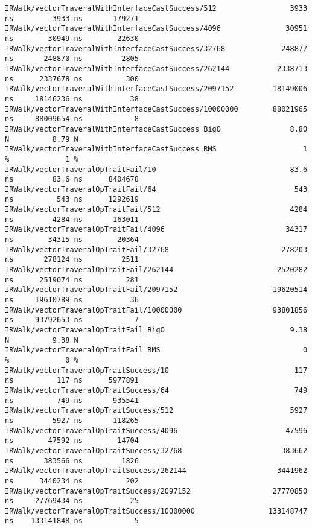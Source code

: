 \begin{code}
\begin{verbatim}
IRWalk/vectorTraveralWithInterfaceCastSuccess/512                 3933 ns         3933 ns       179271
IRWalk/vectorTraveralWithInterfaceCastSuccess/4096               30951 ns        30949 ns        22630
IRWalk/vectorTraveralWithInterfaceCastSuccess/32768             248877 ns       248870 ns         2805
IRWalk/vectorTraveralWithInterfaceCastSuccess/262144           2338713 ns      2337678 ns          300
IRWalk/vectorTraveralWithInterfaceCastSuccess/2097152         18149006 ns     18146236 ns           38
IRWalk/vectorTraveralWithInterfaceCastSuccess/10000000        88021965 ns     88009654 ns            8
IRWalk/vectorTraveralWithInterfaceCastSuccess_BigO                8.80 N          8.79 N
IRWalk/vectorTraveralWithInterfaceCastSuccess_RMS                    1 %             1 %
IRWalk/vectorTraveralOpTraitFail/10                               83.6 ns         83.6 ns      8404678
IRWalk/vectorTraveralOpTraitFail/64                                543 ns          543 ns      1292619
IRWalk/vectorTraveralOpTraitFail/512                              4284 ns         4284 ns       163011
IRWalk/vectorTraveralOpTraitFail/4096                            34317 ns        34315 ns        20364
IRWalk/vectorTraveralOpTraitFail/32768                          278203 ns       278124 ns         2511
IRWalk/vectorTraveralOpTraitFail/262144                        2520282 ns      2519074 ns          281
IRWalk/vectorTraveralOpTraitFail/2097152                      19620514 ns     19610789 ns           36
IRWalk/vectorTraveralOpTraitFail/10000000                     93801856 ns     93792653 ns            7
IRWalk/vectorTraveralOpTraitFail_BigO                             9.38 N          9.38 N
IRWalk/vectorTraveralOpTraitFail_RMS                                 0 %             0 %
IRWalk/vectorTraveralOpTraitSuccess/10                             117 ns          117 ns      5977891
IRWalk/vectorTraveralOpTraitSuccess/64                             749 ns          749 ns       935541
IRWalk/vectorTraveralOpTraitSuccess/512                           5927 ns         5927 ns       118265
IRWalk/vectorTraveralOpTraitSuccess/4096                         47596 ns        47592 ns        14704
IRWalk/vectorTraveralOpTraitSuccess/32768                       383662 ns       383566 ns         1826
IRWalk/vectorTraveralOpTraitSuccess/262144                     3441962 ns      3440234 ns          202
IRWalk/vectorTraveralOpTraitSuccess/2097152                   27770850 ns     27769434 ns           25
IRWalk/vectorTraveralOpTraitSuccess/10000000                 133148747 ns    133141848 ns            5

\end{verbatim}
\end{code}
